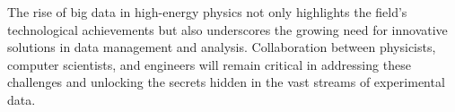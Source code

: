 The rise of big data in high-energy physics not only highlights the field’s technological achievements but also underscores the growing need for innovative solutions in data management and analysis. Collaboration between physicists, computer scientists, and engineers will remain critical in addressing these challenges and unlocking the secrets hidden in the vast streams of experimental data.

